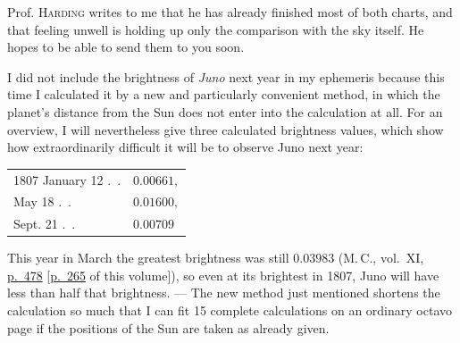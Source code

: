 \par\indent Prof. \textsc{Harding} writes to me that he has already finished most of both charts, and that feeling unwell is holding up only the comparison with the sky itself. He hopes to be able to send them to you soon.

\par\indent I did not include the brightness of \emph{Juno} next year in my ephemeris because this time I calculated it by a new and particularly convenient method, in which the planet’s distance from the Sun does not enter into the calculation at all. For an overview, I will nevertheless give three calculated brightness values, which show how extraordinarily difficult it will be to observe Juno next year:

\begin{center}\begingroup
\fontsize{9}{11}\selectfont
\setlength{\tabcolsep}{3pt}\renewcommand{\arraystretch}{1.12}
\begin{tabular}{ll}
1807 January 12 .\ . & $0.00661,$ \\
May 18 .\ . & $0.01600,$ \\
Sept. 21 .\ . & $0.00709$ \\
\end{tabular}\endgroup\end{center}

\par\indent This year in March the greatest brightness was still $0.03983$ (M.\,C., vol.~XI, \href{https://www.digitale-sammlungen.de/en/view/bsb10538603?page=492}{p.~478} [\hyperlink{native-270}{p.~265} of this volume]), so even at its brightest in 1807, Juno will have less than half that brightness. --- The new method just mentioned shortens the calculation so much that I can fit 15 complete calculations on an ordinary octavo page if the positions of the Sun are taken as already given.

\par{}

